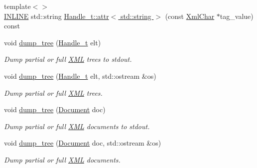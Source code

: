 \begin{DoxyCompactItemize}
{\footnotesize template$<$$>$ }\\\hyperlink{_x_m_l_elements_8h_a2eb6f9e0395b47b8d5e3eeae4fe0c116}{I\+N\+L\+I\+NE} std\+::string \hyperlink{namespace_d_d4hep_1_1_x_m_l_a7802046fcd22f2477a0b2ef7aaf10f0a}{Handle\+\_\+t\+::attr$<$ std\+::string $>$} (const \hyperlink{namespace_d_d4hep_1_1_x_m_l_a09e5d9cc86ed782f6826dfe0778c1815}{Xml\+Char} $\ast$tag\+\_\+value) const
\item 
void \hyperlink{namespace_d_d4hep_1_1_x_m_l_ab1004ab7c53f769743d8bd09c7891fd7}{dump\+\_\+tree} (\hyperlink{class_d_d4hep_1_1_x_m_l_1_1_handle__t}{Handle\+\_\+t} elt)
\begin{DoxyCompactList}\small\item\em Dump partial or full \hyperlink{namespace_d_d4hep_1_1_x_m_l}{X\+ML} trees to stdout. \end{DoxyCompactList}\item 
void \hyperlink{namespace_d_d4hep_1_1_x_m_l_ad133b21bd1bc50d23e939ac03960341b}{dump\+\_\+tree} (\hyperlink{class_d_d4hep_1_1_x_m_l_1_1_handle__t}{Handle\+\_\+t} elt, std\+::ostream \&os)
\begin{DoxyCompactList}\small\item\em Dump partial or full \hyperlink{namespace_d_d4hep_1_1_x_m_l}{X\+ML} trees. \end{DoxyCompactList}\item 
void \hyperlink{namespace_d_d4hep_1_1_x_m_l_af7c204b171cd2ffe30308ce5ecdd5d44}{dump\+\_\+tree} (\hyperlink{class_d_d4hep_1_1_x_m_l_1_1_document}{Document} doc)
\begin{DoxyCompactList}\small\item\em Dump partial or full \hyperlink{namespace_d_d4hep_1_1_x_m_l}{X\+ML} documents to stdout. \end{DoxyCompactList}\item 
void \hyperlink{namespace_d_d4hep_1_1_x_m_l_afd8062f9a152e74ef2dee123cf47433e}{dump\+\_\+tree} (\hyperlink{class_d_d4hep_1_1_x_m_l_1_1_document}{Document} doc, std\+::ostream \&os)
\begin{DoxyCompactList}\small\item\em Dump partial or full \hyperlink{namespace_d_d4hep_1_1_x_m_l}{X\+ML} documents. \end{DoxyCompactList}\end{DoxyCompactItemize}
